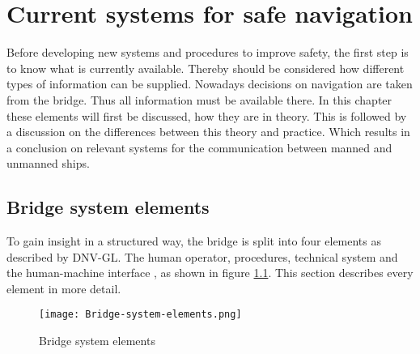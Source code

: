 \chapter{Current systems for safe navigation}
\label{app:systems}
Before developing new systems and procedures to improve safety, the first step is to know what is currently available. Thereby should be considered how different types of information can be supplied. Nowadays decisions on navigation are taken from the bridge. Thus all information must be available there. In this chapter these elements will first be discussed, how they are in theory. This is followed by a discussion on the differences between this theory and practice. Which results in a conclusion on relevant systems for the communication between manned and unmanned ships.

\section{Bridge system elements}
To gain insight in a structured way, the bridge is split into four elements as described by DNV-GL. The human operator, procedures, technical system and the human-machine interface \cite{DNVGL2011}, as shown in figure \ref{fig:Bridge-system-elements}. This section describes every element in more detail.

\begin{figure}[H]
	\centering
	\texttt{[image: Bridge-system-elements.png]}
	\caption{Bridge system elements}
	\label{fig:Bridge-system-elements}
\end{figure}

